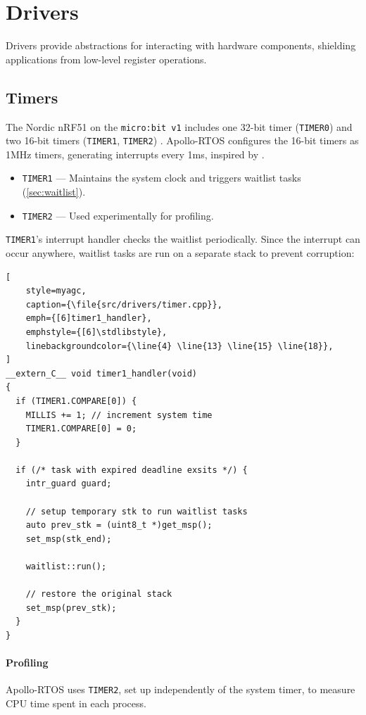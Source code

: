 \section{Drivers}
\label{sec:drivers}

Drivers provide abstractions for interacting with hardware components, shielding
applications from low-level register operations.

\subsection{Timers}

The Nordic nRF51 on the \texttt{micro:bit v1} includes one 32-bit timer
(\lstinline[style=myagc]|TIMER0|) and two 16-bit timers
(\lstinline[style=myagc]|TIMER1|, \lstinline[style=myagc]|TIMER2|) \citep{board_trm}.
Apollo-RTOS configures the 16-bit timers as 1MHz timers, generating interrupts every
1ms, inspired by \citet{microbian}. 
\begin{itemize}
    \item \lstinline[style=myagc]|TIMER1| — Maintains the system clock and triggers
        waitlist tasks (\autoref{sec:waitlist}).
    \item \lstinline[style=myagc]|TIMER2| — Used experimentally for profiling.
\end{itemize}

\lstinline[style=myagc]|TIMER1|'s interrupt handler checks the waitlist periodically.
Since the interrupt can occur anywhere, waitlist tasks are run on a separate stack to
prevent corruption:

\begin{lstlisting}[
    style=myagc,
    caption={\file{src/drivers/timer.cpp}},
    emph={[6]timer1_handler},
    emphstyle={[6]\stdlibstyle},
    linebackgroundcolor={\line{4} \line{13} \line{15} \line{18}},
]
__extern_C__ void timer1_handler(void)
{
  if (TIMER1.COMPARE[0]) {
    MILLIS += 1; // increment system time
    TIMER1.COMPARE[0] = 0;
  }

  if (/* task with expired deadline exsits */) {
    intr_guard guard;

    // setup temporary stk to run waitlist tasks
    auto prev_stk = (uint8_t *)get_msp();
    set_msp(stk_end); 

    waitlist::run();

    // restore the original stack
    set_msp(prev_stk);
  }
}
\end{lstlisting}


\paragraph*{Profiling} Apollo-RTOS uses \lstinline[style=myagc]|TIMER2|, set up
independently of the system timer, to measure CPU time spent in each process.

